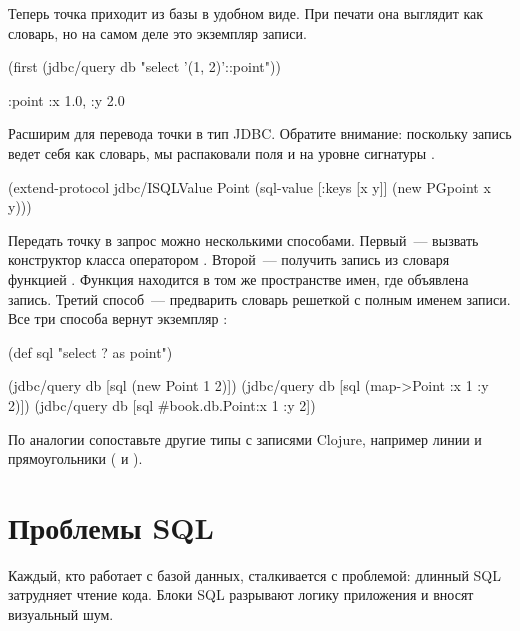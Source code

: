 Теперь точка приходит из базы в удобном виде. При печати она выглядит как словарь, но на самом деле это экземпляр записи.


\begin{english}
  \begin{clojure}
(first (jdbc/query db "select '(1, 2)'::point"))

{:point {:x 1.0, :y 2.0}}
  \end{clojure}
\end{english}

Расширим  для перевода точки в тип JDBC. Обратите внимание: поскольку запись ведет себя как словарь, мы распаковали поля  и  на уровне сигнатуры .

\begin{english}
  \begin{clojure/lines}
(extend-protocol jdbc/ISQLValue
  Point
  (sql-value [{:keys [x y]}]
    (new PGpoint x y)))
  \end{clojure/lines}
\end{english}

Передать точку в запрос можно несколькими способами. Первый~--- вызвать конструктор класса оператором . Второй~--- получить запись из словаря функцией . Функция находится в том же пространстве имен, где объявлена запись. Третий способ~--- предварить словарь решеткой с полным именем записи. Все три способа вернут экземпляр :

\begin{english}
  \begin{clojure}
(def sql "select ? as point")

(jdbc/query db [sql (new Point 1 2)])
(jdbc/query db [sql (map->Point {:x 1 :y 2})])
(jdbc/query db [sql #book.db.Point{:x 1 :y 2}])
  \end{clojure}
\end{english}

По аналогии сопоставьте другие типы с записями Clojure, например линии и прямоугольники ( и ).

\section{Проблемы SQL}

Каждый, кто работает с базой данных, сталкивается с проблемой: длинный SQL затрудняет чтение кода. Блоки SQL разрывают логику приложения и вносят визуальный шум.

